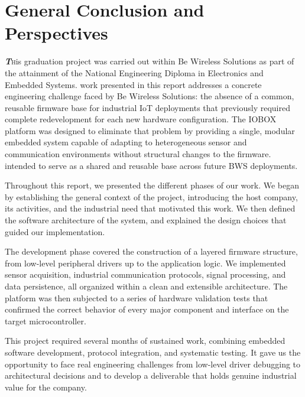 \clearpage
\chapter*{{\emph\LARGE{General Conclusion and Perspectives}}}
\pagestyle{fancy}
\fancyhf{}
\cfoot{\thepage}



\lettrine[lines=2,loversize=0.1]{\textbf{\textit{T}}}his graduation project was carried out within Be Wireless Solutions as 
part of the attainment of the National Engineering Diploma in Electronics 
and Embedded Systems. 
 work presented in this report addresses a concrete engineering challenge 
faced by Be Wireless Solutions: the absence of a common, reusable firmware 
base for industrial IoT deployments that previously required complete 
redevelopment for each new hardware configuration. The IOBOX platform was 
designed to eliminate that problem by providing a single, modular embedded 
system capable of adapting to heterogeneous sensor and communication 
environments without structural changes to the firmware.
intended to serve as a shared and reusable base across future BWS deployments.


Throughout this report, we presented the different phases of our work. We 
began by establishing the general context of the project, introducing the 
host company, its activities, and the industrial need that motivated this work. 
We then defined the software architecture of the system, and explained the design choices that guided our 
implementation.

The development phase covered the construction of a layered firmware 
structure, from low-level peripheral drivers up to the application logic. 
We implemented sensor acquisition, industrial communication protocols, 
signal processing, and data persistence, all organized within a clean and 
extensible architecture. The platform was then subjected to a series of 
hardware validation tests that confirmed the correct behavior of every 
major component and interface on the target microcontroller.

This project required several months of sustained work, combining embedded software development, protocol integration, and 
systematic testing. It gave us the opportunity to face real engineering 
challenges  from low-level driver debugging to architectural decisions 
and to develop a deliverable that holds genuine industrial value for the company.

